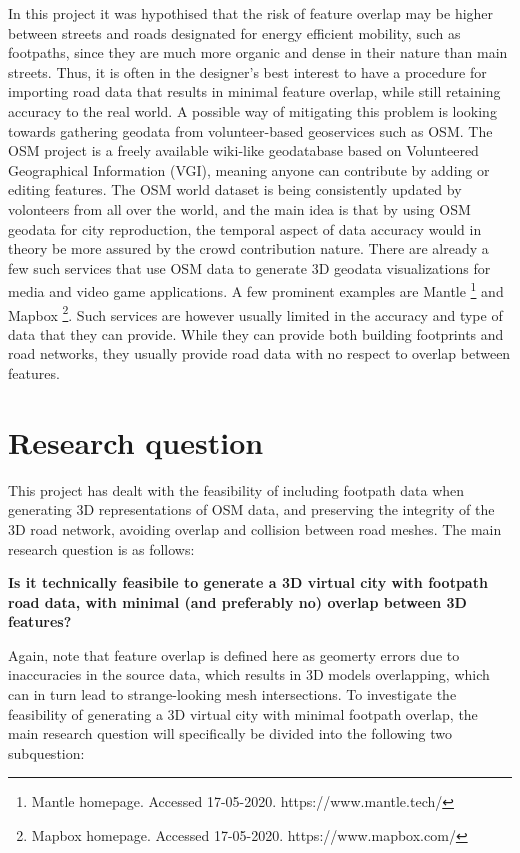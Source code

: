 \documentclass{kththesis}
\begin{document}
In this project it was hypothised that the risk of feature overlap may be higher between streets and roads designated for energy efficient mobility, such as footpaths, since they are much more organic and dense in their nature than main streets.
Thus, it is often in the designer's best interest to have a procedure for importing road data that results in minimal feature overlap, while still retaining accuracy to the real world.
A possible way of mitigating this problem is looking towards gathering geodata from volunteer-based geoservices such as OSM.
The OSM project is a freely available wiki-like geodatabase based on Volunteered Geographical Information (VGI), meaning anyone can contribute by adding or editing features.
The OSM world dataset is being consistently updated by volonteers from all over the world, and the main idea is that by using OSM geodata for city reproduction, the temporal aspect of data accuracy would in theory be more assured by the crowd contribution nature.
There are already a few such services that use OSM data to generate 3D geodata visualizations for media and video game applications.
A few prominent examples are Mantle
\footnote{Mantle homepage. Accessed 17-05-2020. https://www.mantle.tech/}
and Mapbox
\footnote{Mapbox homepage. Accessed 17-05-2020. https://www.mapbox.com/}.
Such services are however usually limited in the accuracy and type of data that they can provide.
While they can provide both building footprints and road networks, they usually provide road data with no respect to overlap between features.

\section{Research question}

This project has dealt with the feasibility of including footpath data when generating 3D representations of OSM data, and preserving the integrity of the 3D road network, avoiding overlap and collision between road meshes. The main research question is as follows:
\begin{center}
    \textbf{Is it technically feasibile to generate a 3D virtual city with footpath road data, with minimal (and preferably no) overlap between 3D features?}
\end{center}

Again, note that feature overlap is defined here as geomerty errors due to inaccuracies in the source data, which results in 3D models overlapping, which can in turn lead to strange-looking mesh intersections.
To investigate the feasibility of generating a 3D virtual city with minimal footpath overlap, the main research question will specifically be divided into the following two subquestion:
\end{document}
